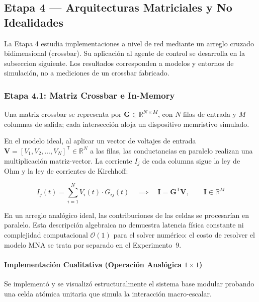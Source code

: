 
\subsection{Etapa 4 --- Arquitecturas Matriciales y No Idealidades}
\label{ch:fase4}

La Etapa 4 estudia implementaciones a nivel de red mediante un
arreglo cruzado bidimensional (crossbar). Su aplicación al agente de
control se desarrolla en la subseccion siguiente. Los resultados
corresponden a modelos y entornos de simulación, no a mediciones de
un crossbar fabricado.

\subsubsection{Etapa 4.1: Matriz Crossbar e In-Memory}
\label{sec:etapa4_1}

Una matriz crossbar se representa por
$\mathbf{G}\in\mathbb{R}^{N\times M}$, con $N$ filas de entrada y
$M$ columnas de salida; cada intersección aloja un dispositivo
memristivo simulado.

En el modelo ideal, al aplicar un vector de voltajes de entrada
$\mathbf{V}=[V_1,V_2,\dots,V_N]^{\mathsf T}\in\mathbb{R}^{N}$ a las
filas, las conductancias en paralelo realizan una multiplicación
matriz-vector. La corriente $I_j$ de cada columna sigue la ley de Ohm
y la ley de corrientes de Kirchhoff:

\begin{equation}
I_j(t) = \sum_{i=1}^N V_i(t) \cdot G_{ij}(t) \quad \implies \quad \mathbf{I} = \mathbf{G}^{\mathsf T} \mathbf{V},\qquad \mathbf{I}\in\mathbb{R}^{M}
\label{eq:vmm_law}
\end{equation}

En un arreglo analógico ideal, las contribuciones de las celdas se procesarían en paralelo. Esta descripción algebraica no demuestra latencia física constante ni complejidad computacional $\mathcal{O}(1)$ para el solver numérico: el costo de resolver el modelo MNA se trata por separado en el Experimento~9.

\paragraph{Implementación Cualitativa (Operación Analógica $1 \times 1$)}
Se implementó y se visualizó estructuralmente el sistema base modular probando una celda atómica unitaria que simula la interacción macro-escalar. 

